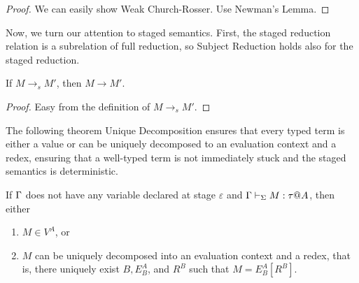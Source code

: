 \begin{proof}
  We can easily show Weak Church-Rosser. Use Newman's Lemma.
\end{proof}

Now, we turn our attention to staged semantics.  First, the staged
reduction relation is a subrelation of full reduction, so Subject
Reduction holds also for the staged reduction.

\begin{lemma}
  If $M \longrightarrow_s M'$, then $M \longrightarrow M'$.
\end{lemma}
\begin{proof}
    Easy from the definition of \( M \longrightarrow_s M' \).
\end{proof}

The following theorem Unique Decomposition ensures that every typed
term is either a value or can be uniquely decomposed to an evaluation
context and a redex, ensuring that a well-typed term is not
immediately stuck and the staged semantics is deterministic.

\begin{lemma}
    If $\Gamma$ does not have any variable declared at stage $\varepsilon$
    and $\Gamma \vdash_\Sigma M : \tau @ A$, then either
    \begin{enumerate}
        \item $ M \in V^A$, or
        \item $M$ can be uniquely decomposed into an evaluation context and a redex, that is, there uniquely exist $B, E^A_B$, and $R^B$ such that $M = E^A_B[R^B]$.
    \end{enumerate}
\end{lemma}

